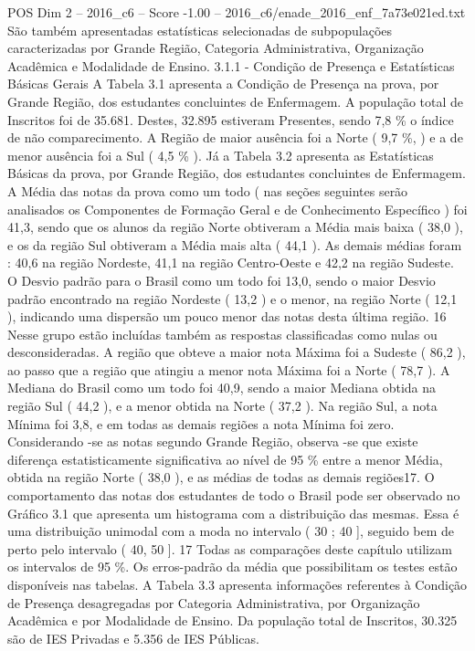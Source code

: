 \begin{textsample}{POS Dim 2 – 2016\_c6 – Score -1.00 – 2016\_c6/enade\_2016\_enf\_7a73e021ed.txt}
São também apresentadas estatísticas selecionadas de subpopulações caracterizadas por Grande Região, Categoria Administrativa, Organização Acadêmica e Modalidade de Ensino. 3.1.1 - Condição de Presença e Estatísticas Básicas Gerais A Tabela 3.1 apresenta a Condição de Presença na prova, por Grande Região, dos estudantes concluintes de Enfermagem.
A população total de Inscritos foi de 35.681.
Destes, 32.895 estiveram Presentes, sendo 7,8 \% o índice de não comparecimento.
A Região de maior ausência foi a Norte ( 9,7 \%, ) e a de menor ausência foi a Sul ( 4,5 \% ).
Já a Tabela 3.2 apresenta as Estatísticas Básicas da prova, por Grande Região, dos estudantes concluintes de Enfermagem.
A Média das notas da prova como um todo ( nas seções seguintes serão analisados os Componentes de Formação Geral e de Conhecimento Específico ) foi 41,3, sendo que os alunos da região Norte obtiveram a Média mais baixa ( 38,0 ), e os da região Sul obtiveram a Média mais alta ( 44,1 ).
As demais médias foram : 40,6 na região Nordeste, 41,1 na região Centro-Oeste e 42,2 na região Sudeste.
O Desvio padrão para o Brasil como um todo foi 13,0, sendo o maior Desvio padrão encontrado na região Nordeste ( 13,2 ) e o menor, na região Norte ( 12,1 ), indicando uma dispersão um pouco menor das notas desta última região. 16 Nesse grupo estão incluídas também as respostas classificadas como nulas ou desconsideradas.
A região que obteve a maior nota Máxima foi a Sudeste ( 86,2 ), ao passo que a região que atingiu a menor nota Máxima foi a Norte ( 78,7 ).
A Mediana do Brasil como um todo foi 40,9, sendo a maior Mediana obtida na região Sul ( 44,2 ), e a menor obtida na Norte ( 37,2 ).
Na região Sul, a nota Mínima foi 3,8, e em todas as demais regiões a nota Mínima foi zero.
Considerando -se as notas segundo Grande Região, observa -se que existe diferença estatisticamente significativa ao nível de 95 \% entre a menor Média, obtida na região Norte ( 38,0 ), e as médias de todas as demais regiões17.
O comportamento das notas dos estudantes de todo o Brasil pode ser observado no Gráfico 3.1 que apresenta um histograma com a distribuição das mesmas.
Essa é uma distribuição unimodal com a moda no intervalo ( 30 ; 40 ], seguido bem de perto pelo intervalo ( 40, 50 ]. 17 Todas as comparações deste capítulo utilizam os intervalos de 95 \%.
Os erros-padrão da média que possibilitam os testes estão disponíveis nas tabelas.
A Tabela 3.3 apresenta informações referentes à Condição de Presença desagregadas por Categoria Administrativa, por Organização Acadêmica e por Modalidade de Ensino.
Da população total de Inscritos, 30.325 são de IES Privadas e 5.356 de IES Públicas.

\end{textsample}
